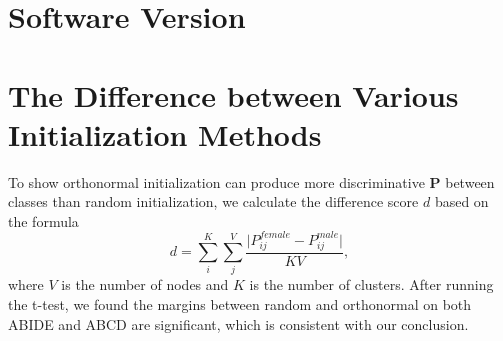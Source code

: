 \section{Software Version}
\label{app:software}
\begin{table}[htbp]
\centering
\small
\caption{The dependency of \methodtable.}
\label{tab:software}
\end{table}


\section{The Difference between Various Initialization Methods}
\label{app:difference}
To show orthonormal initialization can produce more discriminative $\bm P$ between classes than random initialization, we calculate the difference score $d$ based on the formula 
\begin{equation}
 d = \sum_{i}^{K}\sum_{j}^{V}\frac{\lvert P_{ij}^{female}-P_{ij}^{male}\rvert}{KV},   
\end{equation}
where $V$ is the number of nodes and $K$ is the number of clusters. After running the t-test, we found the margins between random and orthonormal on both ABIDE and ABCD are significant, which is consistent with our conclusion.

\begin{table}[h]
\centering
\small
\caption{The difference score between different initialization methods.}
\label{tab:diff}
\end{table}




